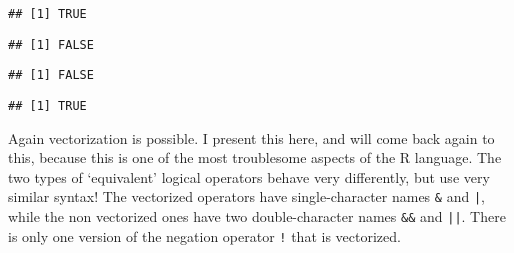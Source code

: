 \documentclass[paper=a4,10pt,div=17,headsepline,BCOR=12mm,twoside,open=right]{scrbook}\usepackage{knitr}
\begin{document}
\begin{knitrout}\footnotesize
{}\color{fgcolor}\begin{kframe}
\begin{alltt}
 \hlkwb{<-} 
 \hlkwb{<-} 
\end{alltt}
\begin{verbatim}
## [1] TRUE
\end{verbatim}
\begin{alltt}
\hlopt{!} 
\end{alltt}
\begin{verbatim}
## [1] FALSE
\end{verbatim}
\begin{alltt}
 \hlopt{&&}  
\end{alltt}
\begin{verbatim}
## [1] FALSE
\end{verbatim}
\begin{alltt}
 \hlopt{||}  
\end{alltt}
\begin{verbatim}
## [1] TRUE
\end{verbatim}
\end{kframe}
\end{knitrout}

Again vectorization is possible. I present this here, and will come back again to this, because this is one of the most troublesome aspects of the R language. The two types of `equivalent' logical operators behave very differently, but use very similar syntax! The vectorized operators have single-character names \verb|&| and \verb:|:, while the non vectorized ones have two double-character names \verb|&&| and \verb:||:. There is only one version of the negation operator \verb|!| that is vectorized.
\end{document}
